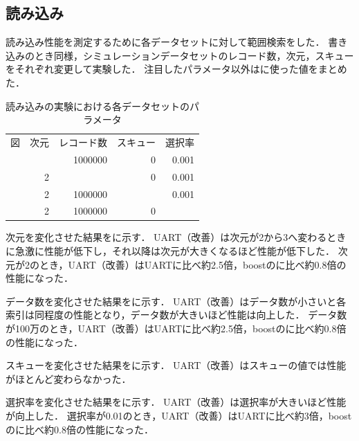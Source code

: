 \subsection{読み込み}

読み込み性能を測定するために各データセットに対して範囲検索をした．
書き込みのとき同様，シミュレーションデータセットのレコード数，次元，スキューをそれぞれ変更して実験した．
注目したパラメータ以外は\Tab{\ref{tab:scan}}に使った値をまとめた．
\begin{table}[tb]
  \caption{読み込みの実験における各データセットのパラメータ}
  \label{tab:scan}
  \centering \small
  \begin{tabular}{lrrrr}
    \toprule
    図                               & 次元 & レコード数 & スキュー & 選択率 \\
    \cmidrule(lr){1-1}
    \cmidrule(lr){2-2}
    \cmidrule(lr){3-3}
    \cmidrule(lr){4-4}
    \cmidrule(lr){5-5}
    \Fig{\ref{graph:dim-sc}}         & \-   & 1000000    & 0        & 0.001  \\
    \Fig{\ref{graph:rec-sc}}         & 2    & \-         & 0        & 0.001  \\
    \Fig{\ref{graph:skew-sc}}        & 2    & 1000000    & \-       & 0.001  \\
    \Fig{\ref{graph:selectivity-sc}} & 2    & 1000000    & 0        & \-     \\
    \bottomrule
  \end{tabular}
\end{table}

次元を変化させた結果を\Fig{\ref{graph:dim-sc}}に示す．
UART（改善）は次元が2から3へ変わるときに急激に性能が低下し，それ以降は次元が大きくなるほど性能が低下した．
次元が2のとき，UART（改善）はUARTに比べ約2.5倍，boostの\RTree に比べ約0.8倍の性能になった．



データ数を変化させた結果を\Fig{\ref{graph:rec-sc}}に示す．
UART（改善）はデータ数が小さいと各索引は同程度の性能となり，データ数が大きいほど性能は向上した．
データ数が100万のとき，UART（改善）はUARTに比べ約2.5倍，boostの\RTree に比べ約0.8倍の性能になった．


スキューを変化させた結果を\Fig{\ref{graph:skew-sc}}に示す．
UART（改善）はスキューの値では性能がほとんど変わらなかった．


選択率を変化させた結果を\Fig{\ref{graph:selectivity-sc}}に示す．
UART（改善）は選択率が大きいほど性能が向上した．
選択率が0.01のとき，UART（改善）はUARTに比べ約3倍，boostの\RTree に比べ約0.8倍の性能になった．



